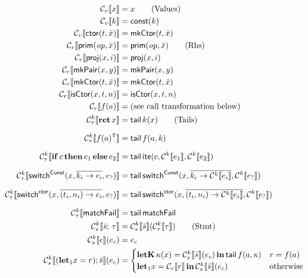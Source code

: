 \documentclass[a4paper, 11pt]{article}
\theoremstyle{remark}\newtheorem*{remark}{Remark}
\theoremstyle{definition}\newtheorem*{definition}{Definition}
\begin{document}
\begingroup
\allowdisplaybreaks
\begin{align*}
\mathcal{C}_v\llbracket x \rrbracket &= x \tag{Values} \\
\mathcal{C}_v\llbracket k \rrbracket &= \mathsf{const}(k) \\
\mathcal{C}_v\llbracket \mathsf{ctor}(t, \bar{x}) \rrbracket &= \mathsf{mkCtor}(t, \bar{x})\\
\mathcal{C}_r\llbracket \mathsf{prim}(\mathit{op}, \bar{x}) \rrbracket &= \mathsf{prim}(\mathit{op}, \bar{x}) \tag{Rhs} \\
\mathcal{C}_r\llbracket \mathsf{proj}(x, i) \rrbracket &= \mathsf{proj}(x, i) \\
\mathcal{C}_r\llbracket \mathsf{mkPair}(x, y) \rrbracket &= \mathsf{mkPair}(x, y) \\
\mathcal{C}_r\llbracket \mathsf{mkCtor}(t, \bar{x}) \rrbracket &= \mathsf{mkCtor}(t, \bar{x}) \\
\mathcal{C}_r\llbracket \mathsf{isCtor}(x, t, n) \rrbracket &= \mathsf{isCtor}(x, t, n) \\
\mathcal{C}_r\llbracket f(a) \rrbracket &= \text{(see call transformation below)}\\
\mathcal{C}_\tau^k\llbracket \mathbf{ret}\, x \rrbracket &= \mathsf{tail}\, k(x) \tag{Tails} \\[6pt]
\mathcal{C}_\tau^k\llbracket f(a)^{\mathsf{T}} \rrbracket &= \mathsf{tail}\, f(a, k) \\[6pt]
\mathcal{C}_\tau^k\llbracket \mathbf{if}\, c\, \mathbf{then}\, e_1\, \mathbf{else}\, e_2 \rrbracket &=
\mathsf{tail}\, \mathsf{ite}(c, \mathcal{C}^k\llbracket e_1 \rrbracket, \mathcal{C}^k\llbracket e_2 \rrbracket) \\[6pt]
\mathcal{C}_\tau^k\llbracket \mathsf{switch}^{\mathsf{Const}}(x, \overline{k_i \to e_i}, e_?) \rrbracket &=
\mathsf{tail}\, \mathsf{switch}^{\mathsf{Const}}(x, \overline{k_i \to \mathcal{C}^k\llbracket e_i \rrbracket}, \mathcal{C}^k\llbracket e_? \rrbracket) \\[6pt]
\mathcal{C}_\tau^k\llbracket \mathsf{switch}^{\mathsf{ctor}}(x, \overline{(t_i, n_i) \to e_i}, e_?) \rrbracket &=
\mathsf{tail}\, \mathsf{switch}^{\mathsf{ctor}}(x, \overline{(t_i, n_i) \to \mathcal{C}^k\llbracket e_i \rrbracket}, \mathcal{C}^k\llbracket e_? \rrbracket) \\[6pt]
\mathcal{C}_\tau^k\llbracket \mathsf{matchFail} \rrbracket &= \mathsf{tail}\, \mathsf{matchFail}\\
\mathcal{C}_s^k\llbracket \bar{s};\, \tau \rrbracket &= \mathcal{C}_s^k\llbracket \bar{s} \rrbracket(\mathcal{C}_\tau^k\llbracket \tau \rrbracket) \tag{Stmt} \\
\mathcal{C}_s^k\llbracket \epsilon \rrbracket(e_c) &= e_c \\
\mathcal{C}_s^k\llbracket (\mathbf{let}_1 x = r); \bar{s} \rrbracket(e_c) &=
\begin{cases}
  \mathbf{letK}\, \kappa(x) = \mathcal{C}_s^k\llbracket \bar{s} \rrbracket(e_c)\, \mathbf{in}\, \mathsf{tail}\, f(a, \kappa)
  & r = f(a) \\
  \mathbf{let}_1 x = \mathcal{C}_r\llbracket r \rrbracket\, \mathbf{in}\, \mathcal{C}_s^k\llbracket \bar{s} \rrbracket(e_c)
  & \text{otherwise}

\end{cases}
\end{align*}
\end{document}
